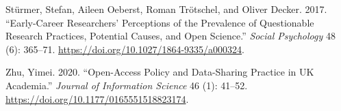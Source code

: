 \documentclass[
  english,
  letterpaper,
]{article}
\newlength{\cslhangindent}
\newenvironment{CSLReferences}[2] %
 {\begin{list}{}{%
  \setlength{\itemindent}{0pt}
  \setlength{\leftmargin}{0pt}
  \setlength{\parsep}{0pt}
  \ifodd #1
   \setlength{\leftmargin}{\cslhangindent}
   \setlength{\itemindent}{-1\cslhangindent}
  \fi
  \setlength{\itemsep}{#2\baselineskip}}}
 {\end{list}}
\begin{document}
\begin{CSLReferences}{1}{0}
Stürmer, Stefan, Aileen Oeberst, Roman Trötschel, and Oliver Decker.
2017. {``Early-{Career Researchers}' {Perceptions} of the {Prevalence}
of {Questionable Research Practices}, {Potential Causes}, and {Open
Science}.''} \emph{Social Psychology} 48 (6): 365--71.
\url{https://doi.org/10.1027/1864-9335/a000324}.

Zhu, Yimei. 2020. {``Open-Access Policy and Data-Sharing Practice in
{UK} Academia.''} \emph{Journal of Information Science} 46 (1): 41--52.
\url{https://doi.org/10.1177/0165551518823174}.

\end{CSLReferences}
\end{document}
